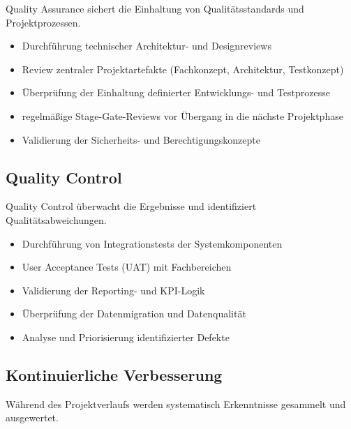 Quality Assurance sichert die Einhaltung von Qualitätsstandards und Projektprozessen.

\begin{itemize}
    \item Durchführung technischer Architektur- und Designreviews
    \item Review zentraler Projektartefakte (Fachkonzept, Architektur, Testkonzept)
    \item Überprüfung der Einhaltung definierter Entwicklungs- und Testprozesse
    \item regelmäßige Stage-Gate-Reviews vor Übergang in die nächste Projektphase
    \item Validierung der Sicherheits- und Berechtigungskonzepte
\end{itemize}

\subsection{Quality Control}

Quality Control überwacht die Ergebnisse und identifiziert Qualitätsabweichungen.

\begin{itemize}
    \item Durchführung von Integrationstests der Systemkomponenten
    \item User Acceptance Tests (\ac{UAT}) mit Fachbereichen
    \item Validierung der Reporting- und \ac{KPI}-Logik
    \item Überprüfung der Datenmigration und Datenqualität
    \item Analyse und Priorisierung identifizierter Defekte
\end{itemize}

\subsection{Kontinuierliche Verbesserung}

Während des Projektverlaufs werden systematisch Erkenntnisse gesammelt und ausgewertet.

